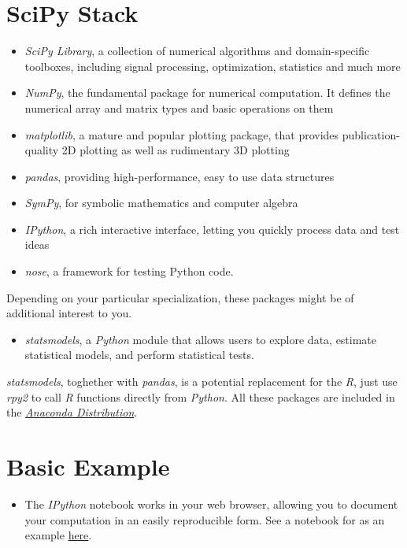 \section{SciPy Stack}
\begin{itemize}

\item \textit{SciPy Library}, a collection of numerical algorithms and domain-specific toolboxes, including signal processing, optimization, statistics and much more
\item \textit{NumPy}, the fundamental package for numerical computation. It defines the numerical array and matrix types and basic operations on them
\item \textit{matplotlib}, a mature and popular plotting package, that provides publication-quality 2D plotting as well as rudimentary 3D plotting
\item \textit{pandas}, providing high-performance, easy to use data structures
\item \textit{SymPy}, for symbolic mathematics and computer algebra
\item \textit{IPython}, a rich interactive interface, letting you quickly process data and test ideas
\item \textit{nose}, a framework for testing Python code.
\end{itemize}

Depending on your particular specialization, these packages might be of additional interest to you.

\begin{itemize}
\item \textit{statsmodels}, a \textit{Python} module that allows users to explore data, estimate statistical models, and perform statistical tests. 
\end{itemize}

\textit{statsmodels}, toghether with \textit{pandas}, is a potential replacement for the \textit{R}, just use \textit{rpy2} to call \textit{R} functions directly from \textit{Python}. All these packages are included in the \href{https://www.continuum.io/why-anaconda}{\textit{Anaconda Distribution}}.
\section{Basic Example}
\begin{itemize}
\item The \textit{IPython} notebook works in your web browser, allowing you to document your computation in an easily reproducible form. See a notebook for 
\citet{Reinhart.2010} as an example \href{http://nbviewer.jupyter.org/github/vincentarelbundock/Reinhart-Rogoff/blob/master/reinhart-rogoff.ipynb}{here}.
\end{itemize}
